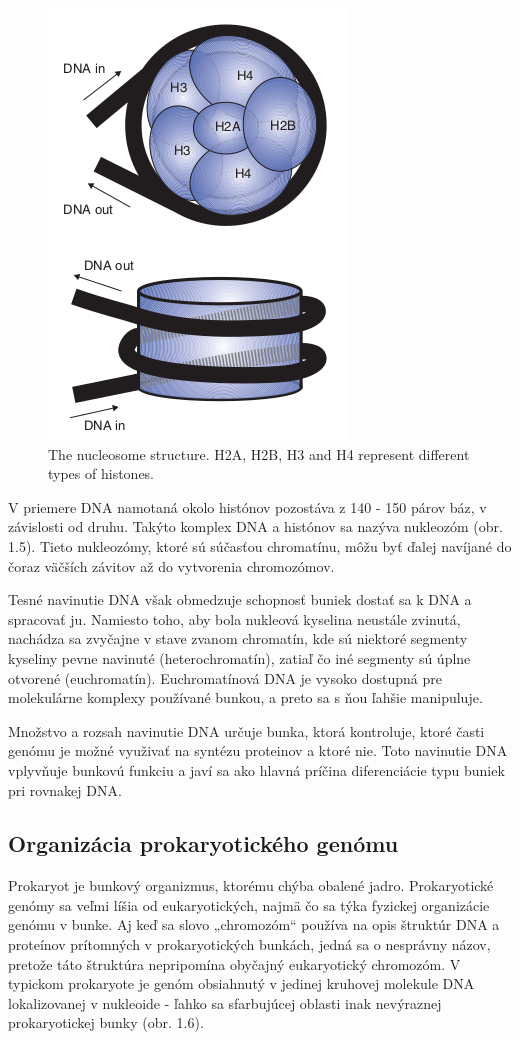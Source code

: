 \begin{figure}[!ht]
	\centering
	\includegraphics[width=.5\textwidth]{figures/nucleoDetailed}
	\caption{The nucleosome structure. H2A, H2B, H3 and H4 represent different types of histones. \label{o:latex_friendly_zone}}
\end{figure}

V priemere DNA namotaná okolo histónov pozostáva z 140 - 150 párov báz, v závislosti od druhu.
Takýto komplex DNA a histónov sa nazýva nukleozóm (obr. 1.5).
Tieto nukleozómy, ktoré sú súčasťou chromatínu, môžu byť ďalej navíjané do čoraz väčších závitov až do vytvorenia chromozómov.

Tesné navinutie DNA však obmedzuje schopnosť buniek dostať sa k DNA a spracovať ju.
Namiesto toho, aby bola nukleová kyselina neustále zvinutá, nachádza sa zvyčajne v stave zvanom chromatín, kde sú niektoré segmenty kyseliny pevne navinuté (heterochromatín), zatiaľ čo iné segmenty sú úplne otvorené (euchromatín).
Euchromatínová DNA je vysoko dostupná pre molekulárne komplexy používané bunkou, a preto sa s ňou ľahšie manipuluje.

Množstvo a rozsah navinutie DNA určuje bunka, ktorá kontroluje, ktoré časti genómu je možné využivať na syntézu proteinov a ktoré nie.
Toto navinutie DNA vplyvňuje bunkovú funkciu a javí sa ako hlavná príčina diferenciácie typu buniek pri rovnakej DNA.

\subsection{Organizácia prokaryotického genómu}
Prokaryot je bunkový organizmus, ktorému chýba obalené jadro.
Prokaryotické genómy sa veľmi líšia od eukaryotických, najmä čo sa týka fyzickej organizácie genómu v bunke.
Aj keď sa slovo „chromozóm“ používa na opis štruktúr DNA a proteínov prítomných v prokaryotických bunkách, jedná sa o nesprávny názov, pretože táto štruktúra nepripomína obyčajný eukaryotický chromozóm.
V typickom prokaryote je genóm obsiahnutý v jedinej kruhovej molekule DNA lokalizovanej v nukleoide - ľahko sa sfarbujúcej oblasti inak nevýraznej prokaryotickej bunky (obr. 1.6).

